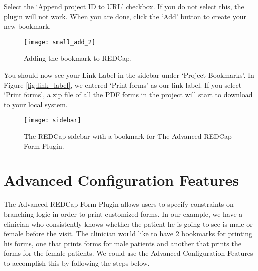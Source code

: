 \documentclass[12pt]{article}
\begin{document}
	Select the `Append project ID to URL' checkbox. If you do not select this, the plugin will not work. When you are done, click the `Add' button to create your new bookmark.
	\begin{figure}[H]
	    \centering
            \texttt{[image: small\_add\_2]}
     	    \caption{Adding the bookmark to REDCap.}
	    \label{fig:append_pid} 
	\end{figure}
	\newpage
        You should now see your Link Label in the sidebar under `Project Bookmarks'. In Figure \ref{fig:link_label}, we entered `Print forms' as our link label. If you select `Print forms', a zip file of all the PDF forms in the project will start to download to your local system.
	\begin{figure}[H]
	     \centering
             \texttt{[image: sidebar]}
     	     \caption{The REDCap sidebar with a bookmark for The Advanced REDCap Form Plugin.} 
	\end{figure}

\section{Advanced Configuration Features} \label{sec:clinician}
The Advanced REDCap Form Plugin allows users to specify constraints on branching logic in order to print customized forms. 
In our example, we have a clinician who consistently knows whether the patient he is going to see is male or female before the visit. The clinician would like to have 2 bookmarks for printing his forms, one that prints forms for male patients and another that prints the forms for the female patients. We could use the Advanced Configuration Features to accomplish this by following the steps below.
\end{document}
